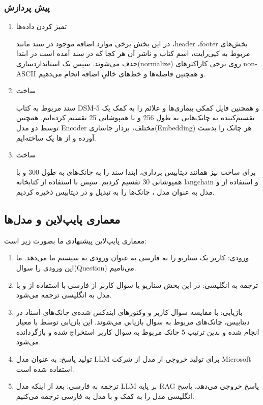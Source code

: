 \documentclass{CCI2020}
\begin{document}
\subsubsection{پیش پردازش}
\begin{enumerate}
    \item تمیز کردن داده‌ها 

    در این بخش برخی موارد اضافه موجود در سند مانند ،header ،footer بخش‌های مربوط به کپی‌رایت، اسم کتاب و ناشر آن هر کجا که در سند آمده است در ابتدا حذف می‌شوند. سپس یک استانداردسازی(normalize) روی برخی کاراکترهای non-ASCII و همچنین فاصله‌ها و خط‌های خالیِ اضافه انجام می‌دهیم.
    \item ساخت 
    
     سند مربوط به کتاب DSM-5  و همچنین فایل کمکی بیماری‌ها و علائم را به کمک یک تقسیم‌کننده به چانک‌هایی به طول 256 و با همپوشانی 25 تقسیم کرده‌ایم. همچنین توسط دو مدل Encoder مختلف، بردار جاسازی(Embedding) هر چانک را بدست آورده و از ها یک  ساخته‌ایم.
    \item ساخت 

    برای ساخت  نیز همانند دیتابیس برداری، ابتدا سند را به چانک‌های به طول 300 و با همپوشانی 30 تقسیم کردیم. سپس با استفاده از کتابخانه langchain و استفاده از  و مدل  به عنوان مدل ، چانک‌ها را به  تبدیل و در دیتابیس  ذخیره کردیم.

    
\end{enumerate}

\subsection{معماری پایپ‌لاین و مدل‌ها}
معماری پایپ‌لاین پیشنهادی ما بصورت زیر است:

\begin{enumerate}
    \item ورودی: کاربر یک سناریو را به فارسی به عنوان ورودی به سیستم ما می‌دهد. ما این ورودی را سوال(Question) می‌نامیم.
    
    \item ترجمه به انگلیسی: در این بخش سناریو یا سوال کاربر از فارسی با استفاده از  و با مدل  به انگلیسی ترجمه می‌شود.
    
    \item بازیابی: با مقایسه سوال کاربر و وکتور‌های ایندکس شده‌ی چانک‌های اسناد در دیتابیس، چانک‌های مربوط به سوال بازیابی می‌شوند. این بازیابی توسط  با معیار  انجام شده و بدین ترتیب 5 چانک مربوط به سوال کاربر استخراج شده و بازگردانده می‌شود.        
    
    \item تولید پاسخ: به عنوان مدل LLM برای تولید خروجی از مدل 
     از شرکت Microsoft استفاده شده است.

    \item ترجمه به فارسی: بعد از اینکه مدل LLM بر پایه RAG پاسخ خروجی می‌دهد، پاسخ انگلیسی مدل را به کمک  و با مدل  به فارسی ترجمه می‌کنیم.
\end{enumerate}
\end{document}
